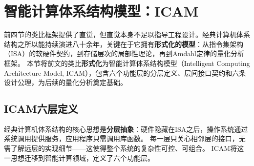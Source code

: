 \section{智能计算体系结构模型：ICAM}
\label{sec:icam}

前四节的类比框架提供了直觉，但直觉本身不足以指导工程设计。经典计算机体系结构之所以能持续演进八十余年，关键在于它拥有\textbf{形式化的模型}：从指令集架构（ISA）的软硬件契约，到存储层次的局部性理论，再到Amdahl定律的量化分析框架。
本节将前文的类比\textbf{形式化}为智能计算体系结构模型（Intelligent Computing Architecture Model, ICAM），包含六个功能层的分层定义、层间接口契约和六条设计公理，为后续的量化分析奠定基础。

\subsection{ICAM六层定义}
\label{sec:icam-layers}

经典计算机体系结构的核心思想是\textbf{分层抽象}：硬件隐藏在ISA之后，操作系统通过系统调用提供服务，应用程序只需调用库函数。
每一层只关心相邻层的接口，无需了解远层的实现细节——这使得整个系统的复杂性可控、可组合。
ICAM将这一思想迁移到智能计算领域，定义了六个功能层。

